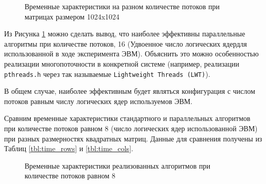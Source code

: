\begin{figure}[ht]
	\centering
	\captionsetup{justification=centering}
	\caption{Временные характеристики на разном количестве потоков при матрицах размером 1024x1024}
	\label{plt:time_1024_long_cmp}
\end{figure}
\clearpage

Из Рисунка \ref{plt:time_1024_long_cmp} можно сделать вывод, что наиболее эффективны параллельные алгоритмы при количестве потоков, 16 (Удвоенное число логических ядердля использованной в ходе эксперимента ЭВМ). Объяснить это можно особенностью реализации многопоточности в конкретной системе (например, реализации \texttt{pthreads.h} \cite{pthread} через так называемые \texttt{Lightweight Threads (LWT)}).

В общем случае, наиболее эффективным будет являться конфигурация с числом потоков равным числу логических ядер используемов ЭВМ.

Сравним временные характеристики стандартного и параллельных алгоритмов при количестве потоков равном 8 (число логических ядер использованной ЭВМ) при разных размерностях квадратных матриц. Данные для сравнения получены из Таблиц \ref{tbl:time_rows} и \ref{tbl:time_cols}.

\begin{figure}[ht]
	\centering
	\captionsetup{justification=centering}
	\caption{Временные характеристики реализованных алгоритмов при количестве потоков равном 8}
	\label{plt:time_cmp}
\end{figure}

